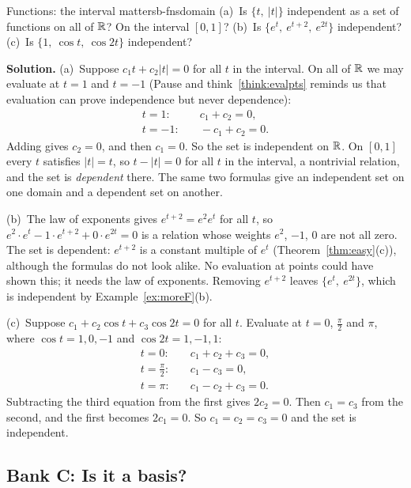 \documentclass[11pt]{article}
\begin{document}
\begin{exmp}{Functions: the interval matters}{b-fnsdomain}
(a)~Is $\{t,\ |t|\}$ independent as a set of functions on all of $\mathbb{R}$? On the interval $[0,1]$? (b)~Is $\{e^t,\ e^{t+2},\ e^{2t}\}$ independent? (c)~Is $\{1,\ \cos t,\ \cos2t\}$ independent?

\textbf{Solution.} (a)~Suppose $c_1t+c_2|t|=0$ for all $t$ in the interval. On all of $\mathbb{R}$ we may evaluate at $t=1$ and $t=-1$ (Pause and think~\ref{think:evalpts} reminds us that evaluation can prove independence but never dependence):
\begin{align*}
t=1:&\quad c_1+c_2=0,\\
t=-1:&\quad -c_1+c_2=0.
\end{align*}
Adding gives $c_2=0$, and then $c_1=0$. So the set is independent on $\mathbb{R}$. On $[0,1]$ every $t$ satisfies $|t|=t$, so $t-|t|=0$ for all $t$ in the interval, a nontrivial relation, and the set is \emph{dependent} there. The same two formulas give an independent set on one domain and a dependent set on another.

(b)~The law of exponents gives $e^{t+2}=e^2e^t$ for all $t$, so $e^2\cdot e^t-1\cdot e^{t+2}+0\cdot e^{2t}=0$ is a relation whose weights $e^2$, $-1$, $0$ are not all zero. The set is dependent: $e^{t+2}$ is a constant multiple of $e^t$ (Theorem~\ref{thm:easy}(c)), although the formulas do not look alike. No evaluation at points could have shown this; it needs the law of exponents. Removing $e^{t+2}$ leaves $\{e^t,\ e^{2t}\}$, which is independent by Example~\ref{ex:moreF}(b).

(c)~Suppose $c_1+c_2\cos t+c_3\cos2t=0$ for all $t$. Evaluate at $t=0$, $\tfrac{\pi}{2}$ and $\pi$, where $\cos t=1,0,-1$ and $\cos2t=1,-1,1$:
\begin{align*}
t=0:&\quad c_1+c_2+c_3=0,\\
t=\tfrac{\pi}{2}:&\quad c_1-c_3=0,\\
t=\pi:&\quad c_1-c_2+c_3=0.
\end{align*}
Subtracting the third equation from the first gives $2c_2=0$. Then $c_1=c_3$ from the second, and the first becomes $2c_1=0$. So $c_1=c_2=c_3=0$ and the set is independent.
\end{exmp}

\subsection*{Bank C: Is it a basis?}
\end{document}
